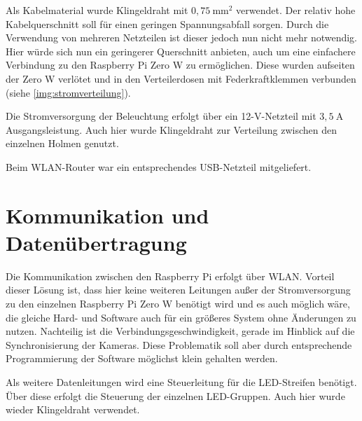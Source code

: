 \documentclass[./00PhotoBox.tex]{subfiles}
\begin{document}
Als Kabelmaterial wurde Klingeldraht mit $0,75~\text{mm}^2$ verwendet. Der relativ hohe Kabelquerschnitt soll für einen geringen Spannungsabfall sorgen. Durch die Verwendung von mehreren Netzteilen ist dieser jedoch nun nicht mehr notwendig. Hier würde sich nun ein geringerer Querschnitt anbieten, auch um eine einfachere Verbindung zu den Raspberry Pi Zero W zu ermöglichen. Diese wurden aufseiten der Zero W verlötet und in den Verteilerdosen mit Federkraftklemmen verbunden (siehe \autoref{img:stromverteilung}).

Die Stromversorgung der Beleuchtung erfolgt über ein 12-V-Netzteil mit $3,5~\text{A}$ Ausgangsleistung. Auch hier wurde Klingeldraht zur Verteilung zwischen den einzelnen Holmen genutzt.

Beim WLAN-Router war ein entsprechendes USB-Netzteil mitgeliefert.

\section{Kommunikation und Datenübertragung}
Die Kommunikation zwischen den Raspberry Pi erfolgt über WLAN. Vorteil dieser Lösung ist, dass hier keine weiteren Leitungen außer der Stromversorgung zu den einzelnen Raspberry Pi Zero W benötigt wird und es auch möglich wäre, die gleiche Hard- und Software auch für ein größeres System ohne Änderungen zu nutzen. Nachteilig ist die Verbindungsgeschwindigkeit, gerade im Hinblick auf die Synchronisierung der Kameras. Diese Problematik soll aber durch entsprechende Programmierung der Software möglichst klein gehalten werden.

Als weitere Datenleitungen wird eine Steuerleitung für die LED-Streifen benötigt. Über diese erfolgt die Steuerung der einzelnen LED-Gruppen. Auch hier wurde wieder Klingeldraht verwendet.

\biblio
\end{document}
